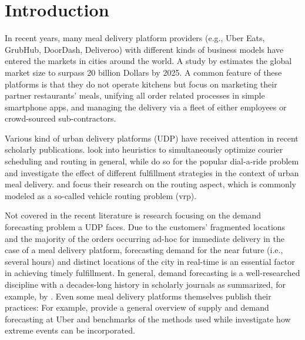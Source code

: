 \section{Introduction}
\label{intro}

In recent years, many meal delivery platform providers (e.g., Uber Eats,
    GrubHub, DoorDash, Deliveroo) with different kinds of business models have
    entered the markets in cities around the world.
A study by \cite{hirschberg2016} estimates the global market size to surpass
    20 billion Dollars by 2025.
A common feature of these platforms is that they do not operate kitchens but
    focus on marketing their partner restaurants' meals, unifying all order
    related processes in simple smartphone apps, and managing the delivery via
    a fleet of either employees or crowd-sourced sub-contractors.

Various kind of urban delivery platforms (UDP) have received attention in
    recent scholarly publications.
\cite{hou2018} look into heuristics to simultaneously optimize courier
    scheduling and routing in general, while \cite{masmoudi2018} do so
    for the popular dial-a-ride problem and \cite{wang2018} investigate
    the effect of different fulfillment strategies in the context of urban
    meal delivery.
\cite{ehmke2018} and \cite{alcaraz2019} focus their research on the routing
    aspect, which is commonly modeled as a so-called vehicle routing problem
    (\gls{vrp}).

Not covered in the recent literature is research focusing on the demand
    forecasting problem a UDP faces.
Due to the customers' fragmented locations and the majority of the orders
    occurring ad-hoc for immediate delivery in the case of a meal delivery
    platform, forecasting demand for the near future (i.e., several hours)
    and distinct locations of the city in real-time is an essential factor
    in achieving timely fulfillment.
In general, demand forecasting is a well-researched discipline with a
    decades-long history in scholarly journals as summarized, for example, by
    \cite{de2006}.
Even some meal delivery platforms themselves publish their practices: For
    example, \cite{bell2018} provide a general overview of supply and demand
    forecasting at Uber and benchmarks of the methods used while
    \cite{laptev2017} investigate how extreme events can be incorporated.

